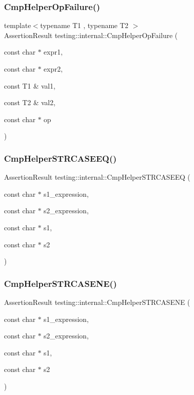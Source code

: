 \subsubsection{\texorpdfstring{CmpHelperOpFailure()}{CmpHelperOpFailure()}}
{\footnotesize\ttfamily template$<$typename T1 , typename T2 $>$ \\
Assertion\+Result testing\+::internal\+::\+Cmp\+Helper\+Op\+Failure (\begin{DoxyParamCaption}\item[{const char $\ast$}]{expr1,  }\item[{const char $\ast$}]{expr2,  }\item[{const T1 \&}]{val1,  }\item[{const T2 \&}]{val2,  }\item[{const char $\ast$}]{op }\end{DoxyParamCaption})}

\mbox{\label{namespacetesting_1_1internal_a30dfeb01f1bc8087c7d05205d5fa75c1}} 
\subsubsection{\texorpdfstring{CmpHelperSTRCASEEQ()}{CmpHelperSTRCASEEQ()}}
{\footnotesize\ttfamily Assertion\+Result testing\+::internal\+::\+Cmp\+Helper\+S\+T\+R\+C\+A\+S\+E\+EQ (\begin{DoxyParamCaption}\item[{const char $\ast$}]{s1\+\_\+expression,  }\item[{const char $\ast$}]{s2\+\_\+expression,  }\item[{const char $\ast$}]{s1,  }\item[{const char $\ast$}]{s2 }\end{DoxyParamCaption})}

\mbox{\label{namespacetesting_1_1internal_a7e31d489f06ab8f6a81a7729f0c377e7}} 
\subsubsection{\texorpdfstring{CmpHelperSTRCASENE()}{CmpHelperSTRCASENE()}}
{\footnotesize\ttfamily Assertion\+Result testing\+::internal\+::\+Cmp\+Helper\+S\+T\+R\+C\+A\+S\+E\+NE (\begin{DoxyParamCaption}\item[{const char $\ast$}]{s1\+\_\+expression,  }\item[{const char $\ast$}]{s2\+\_\+expression,  }\item[{const char $\ast$}]{s1,  }\item[{const char $\ast$}]{s2 }\end{DoxyParamCaption})}

